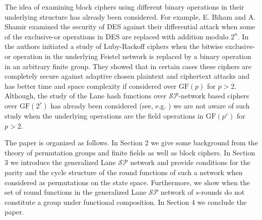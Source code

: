 \documentclass[11pt]{amsart}
\newcommand{\GF}{\mathrm{GF}}
\begin{document}
The idea of examining block ciphers using different binary operations  in their  underlying structure has already been considered. For example, E. Biham and A. Shamir \cite{BS} examined the security of DES against their differential attack when some of the exclusive-or operations in DES are replaced with addition modulo $2^n$. In \cite {PRS} the authors initiated a study of Luby-Rackoff ciphers when the bitwise exclusive-or operation in the underlying Feistel network is replaced by a binary operation in an arbitrary finite group. They showed that in certain cases these ciphers are completely secure against adaptive chosen plaintext and ciphertext attacks and has better time and space complexity if considered over $\GF(p)$ for $p>2$. Although, the study of  the  Lane hash functions over $\mathcal {SP}$-network based ciphers over $\GF(2^r)$ has already been considered (see, e.g. \cite {We}) we are not aware of such study when the underlying operations are the field operations in  $\GF(p^r)$ for $p>2$. 

The paper is organized as follows. In Section 2 we give some background from the theory of permutation groups and finite fields as well as block ciphers.  In Section 3 we introduce the generalized Lane ${\mathcal{SP}}$ network and provide conditions for the parity and the cycle structure of the round functions of such a network when considered as permutations on the state space. Furthermore, we show when the set of round functions in the generalized Lane $\mathcal{SP}$ network of $s$-rounds do not constitute a group under functional composition. In Section 4 we conclude the paper.



\end{document}
